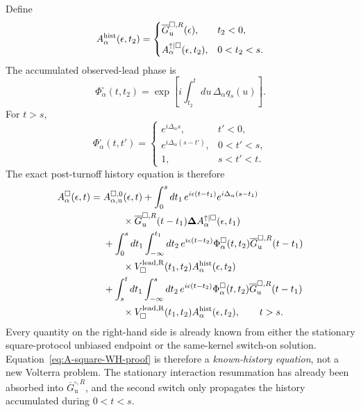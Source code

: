 \documentclass[
 reprint,
 superscriptaddress,
 amsmath,amssymb,
 aps,prb,
 longbibliography,
 floatfix
]{revtex4-2}
\begin{document}
Define
\begin{equation*}
A_\alpha^{\rm hist}(\epsilon,t_2)
=
\begin{cases}
\overline G_{\mathrm u}^{\square,R}(\epsilon),
&
t_2<0,
\\[2mm]
A_\alpha^{\uparrow|\square}(\epsilon,t_2),
&
0<t_2<s.
\end{cases}
\end{equation*}
The accumulated observed-lead phase is
\begin{equation*}
\Phi_\alpha^\square(t,t_2)
=
\exp\left[
i\int_{t_2}^{t}du\,
\Delta_\alpha q_s(u)
\right].
\end{equation*}
For $t>s$,
\begin{equation*}
\Phi_\alpha^\square(t,t')
=
\begin{cases}
e^{i\Delta_\alpha s},
&
t'<0,
\\[1mm]
e^{i\Delta_\alpha(s-t')},
&
0<t'<s,
\\[1mm]
1,
&
s<t'<t.
\end{cases}
\end{equation*}
The exact post-turnoff history equation is therefore
\begin{equation}
\begin{aligned}
A_\alpha^\square(\epsilon,t)
={}&
A_{\alpha,\mathrm u}^{\square,0}
(\epsilon,t)
+
\int_0^s dt_1\,
e^{i\epsilon(t-t_1)}
e^{i\Delta_\alpha(s-t_1)}
\\
&\qquad\times
\overline G_{\mathrm u}^{\square,R}(t-t_1)
\bm\Delta
A_\alpha^{\uparrow|\square}(\epsilon,t_1)
\\
&+
\int_0^s dt_1
\int_{-\infty}^{t_1}dt_2\,
e^{i\epsilon(t-t_2)}
\Phi_\alpha^\square(t,t_2)
\overline G_{\mathrm u}^{\square,R}(t-t_1)
\\
&\qquad\times
V_\square^{\rm lead,R}(t_1,t_2)
A_\alpha^{\rm hist}(\epsilon,t_2)
\\
&+
\int_s^t dt_1
\int_{-\infty}^{s}dt_2\,
e^{i\epsilon(t-t_2)}
\Phi_\alpha^\square(t,t_2)
\overline G_{\mathrm u}^{\square,R}(t-t_1)
\\
&\qquad\times
V_\square^{\rm lead,R}(t_1,t_2)
A_\alpha^{\rm hist}(\epsilon,t_2),
\qquad t>s.
\end{aligned}
\label{eq:A-square-WH-proof}
\end{equation}
Every quantity on the right-hand side is already known from either the stationary square-protocol unbiased endpoint or the same-kernel switch-on solution. Equation~\eqref{eq:A-square-WH-proof} is therefore a \emph{known-history equation}, not a new Volterra problem. The stationary interaction resummation has already been absorbed into $\overline G_{\mathrm u}^{\square,R}$, and the second switch only propagates the history accumulated during $0<t<s$.
\end{document}
